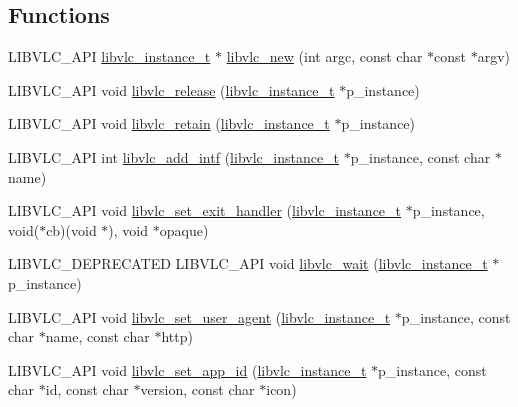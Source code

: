 \subsection*{Functions}
\begin{DoxyCompactItemize}
\item 
L\+I\+B\+V\+L\+C\+\_\+\+A\+PI \hyperlink{group__libvlc__core_ga316d739a80da4678206c79f4d6c2e284}{libvlc\+\_\+instance\+\_\+t} $\ast$ \hyperlink{group__libvlc__core_ga1ecba605b37df9e62d2f8c0290ef3893}{libvlc\+\_\+new} (int argc, const char $\ast$const $\ast$argv)
\item 
L\+I\+B\+V\+L\+C\+\_\+\+A\+PI void \hyperlink{group__libvlc__core_ga42f80821f3b5e2e9a1fe38c96d40ee71}{libvlc\+\_\+release} (\hyperlink{group__libvlc__core_ga316d739a80da4678206c79f4d6c2e284}{libvlc\+\_\+instance\+\_\+t} $\ast$p\+\_\+instance)
\item 
L\+I\+B\+V\+L\+C\+\_\+\+A\+PI void \hyperlink{group__libvlc__core_ga7a09a1aa563f098a11c0b34682a790ca}{libvlc\+\_\+retain} (\hyperlink{group__libvlc__core_ga316d739a80da4678206c79f4d6c2e284}{libvlc\+\_\+instance\+\_\+t} $\ast$p\+\_\+instance)
\item 
L\+I\+B\+V\+L\+C\+\_\+\+A\+PI int \hyperlink{group__libvlc__core_gaee76d8daf854191af20a93eecea1dc6e}{libvlc\+\_\+add\+\_\+intf} (\hyperlink{group__libvlc__core_ga316d739a80da4678206c79f4d6c2e284}{libvlc\+\_\+instance\+\_\+t} $\ast$p\+\_\+instance, const char $\ast$name)
\item 
L\+I\+B\+V\+L\+C\+\_\+\+A\+PI void \hyperlink{group__libvlc__core_ga9fb333dac01fe3e28bbf4256be87f006}{libvlc\+\_\+set\+\_\+exit\+\_\+handler} (\hyperlink{group__libvlc__core_ga316d739a80da4678206c79f4d6c2e284}{libvlc\+\_\+instance\+\_\+t} $\ast$p\+\_\+instance, void($\ast$cb)(void $\ast$), void $\ast$opaque)
\item 
L\+I\+B\+V\+L\+C\+\_\+\+D\+E\+P\+R\+E\+C\+A\+T\+ED L\+I\+B\+V\+L\+C\+\_\+\+A\+PI void \hyperlink{group__libvlc__core_ga8b60fa21d15392338a17c89414502d40}{libvlc\+\_\+wait} (\hyperlink{group__libvlc__core_ga316d739a80da4678206c79f4d6c2e284}{libvlc\+\_\+instance\+\_\+t} $\ast$p\+\_\+instance)
\item 
L\+I\+B\+V\+L\+C\+\_\+\+A\+PI void \hyperlink{group__libvlc__core_ga78044d14fe2a8ea0f2a216f5ad084ec6}{libvlc\+\_\+set\+\_\+user\+\_\+agent} (\hyperlink{group__libvlc__core_ga316d739a80da4678206c79f4d6c2e284}{libvlc\+\_\+instance\+\_\+t} $\ast$p\+\_\+instance, const char $\ast$name, const char $\ast$http)
\item 
L\+I\+B\+V\+L\+C\+\_\+\+A\+PI void \hyperlink{group__libvlc__core_ga2b5434e2f27d19df8646b8240ed719f8}{libvlc\+\_\+set\+\_\+app\+\_\+id} (\hyperlink{group__libvlc__core_ga316d739a80da4678206c79f4d6c2e284}{libvlc\+\_\+instance\+\_\+t} $\ast$p\+\_\+instance, const char $\ast$id, const char $\ast$version, const char $\ast$icon)

\end{DoxyCompactItemize}
